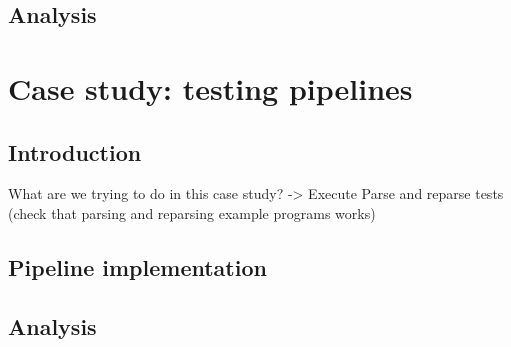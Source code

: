 
\subsection{Analysis}
\label{sec:evaluation__database__analysis}


\section{Case study: testing pipelines}
\label{sec:evaluation__testing}

\subsection{Introduction}
\label{sec:evaluation__testing__introduction}
What are we trying to do in this case study?
-> Execute Parse and reparse tests (check that parsing and reparsing example programs works)


\subsection{Pipeline implementation}
\label{sec:evaluation__testing__implementation}


\subsection{Analysis}
\label{sec:evaluation__testing__analysis}

